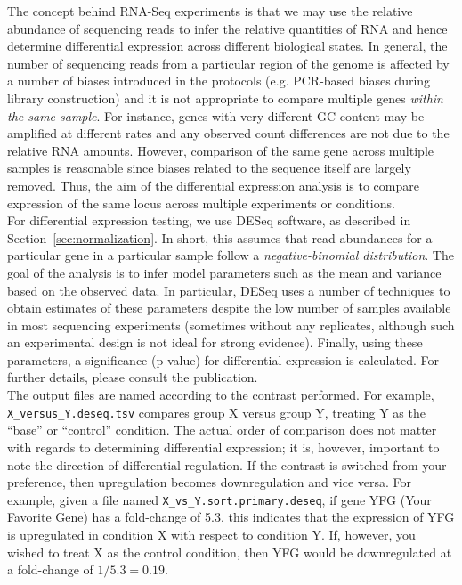\documentclass{article}
\begin{document}
{{{The concept behind RNA-Seq experiments is that we may use the relative abundance of sequencing reads to infer the relative quantities of RNA and hence determine differential expression across different biological states.  In general, the number of sequencing reads from a particular region of the genome is affected by a number of biases introduced in the protocols (e.g. PCR-based biases during library construction) and it is not appropriate to compare multiple genes \emph{within the same sample}.  For instance, genes with very different GC content may be amplified at different rates and any observed count differences are not due to the relative RNA amounts.  However, comparison of the same gene across multiple samples is reasonable since biases related to the sequence itself are largely removed.  Thus, the aim of the differential expression analysis is to compare expression of the same locus across multiple experiments or conditions.\\

For differential expression testing, we use DESeq software, as described in Section~\ref{sec:normalization}.  In short, this assumes that read abundances for a particular gene in a particular sample follow a \emph{negative-binomial distribution}.  The goal of the analysis is to infer model parameters such as the mean and variance based on the observed data.  In particular, DESeq uses a number of techniques to obtain estimates of these parameters despite the low number of samples available in most sequencing experiments (sometimes without any replicates, although such an experimental design is not ideal for strong evidence).  Finally, using these parameters, a significance (p-value) for differential expression is calculated. For further details, please consult the publication.\\  

The output files are named according to the contrast performed.  For example, \verb|X_versus_Y.deseq.tsv| compares group X versus group Y, treating Y as the ``base'' or ``control'' condition.  The actual order of comparison does not matter with regards to determining differential expression; it is, however, important to note the direction of differential regulation.  If the contrast is switched from your preference, then upregulation becomes downregulation and vice versa.  For example, given a file named \verb|X_vs_Y.sort.primary.deseq|, if gene YFG (Your Favorite Gene) has a fold-change of 5.3, this indicates that the expression of YFG is upregulated in condition X with respect to condition Y.  If, however, you wished to treat X as the control condition, then YFG would be downregulated at a fold-change of $1/5.3 = 0.19$.   \\

}}}
\end{document}
